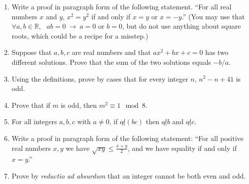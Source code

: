 \documentclass[12pt]{article}
\newcommand{\RR}{{\mathbb R}}
\begin{document}
\begin{enumerate}
   
\item  Write a proof in paragraph form of the following statement.\newline
 ``For all real numbers $x$ and $y$, $x^2=y^2$ if and only if $x=y$ or $x=-y$.''\newline
{\color{Magenta}(You may use that $\forall a,b\in\RR$, \ $ab=0\ \to\ a=0$ or $b=0$, but do not use anything about square roots,
  which could be a recipe for a misstep.)}
  

\item Suppose that $a,b,c$ are real numbers and that $ax^2+bx+c=0$ has two different solutions.
      Prove that the sum of the two solutions equals $-b/a$.

\item Using the definitions, prove by cases that for every integer $n$, $n^2-n+41$ is odd.

\item Prove that if $m$ is odd, then $m^2\equiv 1\mod 8$.

\item For all integers $a,b,c$ with $a\neq 0$, if $a{\not|}(bc)$ then $a{\not|}b$ and $a{\not|}c$.


\item
  Write a proof in paragraph form of the following statement:
  ``For all positive real numbers $x,y$  we have $\sqrt{xy}\leq \frac{x+y}{2}$, and we have equality if and only if $x=y$.''
 

\item
Prove by {\it reductio ad absurdum} that an integer cannot be both even and odd.


\end{enumerate}
\end{document}
